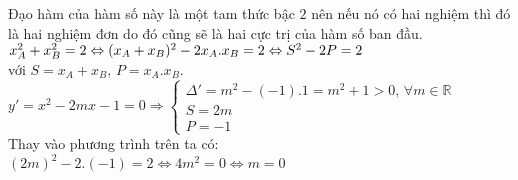 \begin{Solbook}{16}
 \par \noindent  Đạo hàm của hàm số này là một tam thức bậc $2$ nên nếu nó có hai nghiệm thì đó là hai nghiệm đơn do đó cũng sẽ là hai cực trị của hàm số ban đầu. \\ $x_A^2+x_B^2=2 \Leftrightarrow (x_A+x_B)^2-2x_A.x_B=2 \\ \Leftrightarrow S^2-2P=2$\\ với $S=x_A+x_B, \, P=x_A.x_B$.\\ $y'=x^2-2mx-1=0 \Rightarrow \begin {cases} \Delta '=m^2-(-1).1=m^2+1>0 ,\, \forall m \in \mathbb {R}\\ S=2m \\ P=-1 \end {cases}$\\ Thay vào phương trình trên ta có: \\ $(2m)^2-2.(-1)=2 \Leftrightarrow 4m^2=0 \Leftrightarrow m=0$  \par \noindent \selectA \hfill \qedEX 
\end{Solbook}
